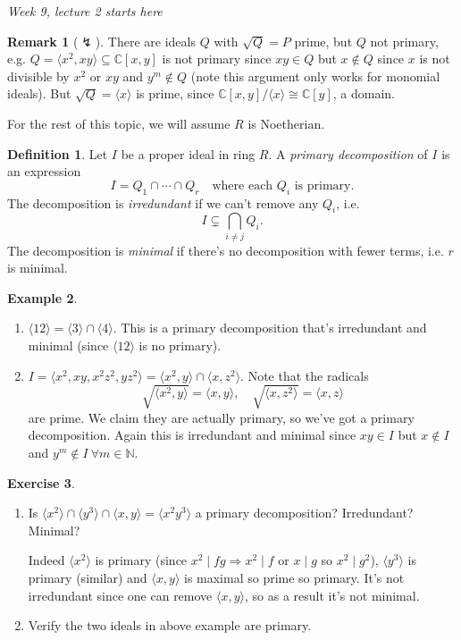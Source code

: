 \documentclass[a4paper]{article}
\newcommand{\la}{\langle}
\newcommand{\ra}{\rangle}
\newcommand{\C}{\mathbb C}
\theoremstyle{definition}
\newtheorem{defn}{Definition}[subsection]
\newtheorem{example}[defn]{Example}
\newtheorem{exe}[defn]{Exercise}
\newtheorem*{remark}{Remark}
\begin{document}
\begin{flushright}
\textit{Week 9, lecture 2 starts here}
\end{flushright}

\begin{remark}[$\lightning$]
There are ideals $Q$ with $\sqrt Q=P$ prime, but $Q$ not primary, e.g. $Q=\la x^2,xy\ra\subseteq\C[x,y]$ is not primary since $xy\in Q$ but $x\notin Q$ since $x$ is not divisible by $x^2$ or $xy$ and $y^m\notin Q$ (note this argument only works for monomial ideals). But $\sqrt Q=\la x\ra$ is prime, since $\C[x,y]/\la x\ra\cong\C[y]$, a domain.
\end{remark}

For the rest of this topic, we will assume $R$ is Noetherian.

\begin{defn}
Let $I$ be a proper ideal in ring $R$. A \textit{primary decomposition} of $I$ is an expression
\[
I=Q_1\cap \cdots \cap Q_r\quad\text{where each }Q_i\text{ is primary}.
\]
The decomposition is \textit{irredundant} if we can't remove any $Q_i$, i.e.
\[
I\subsetneq \bigcap_{i\neq j}Q_i .
\]
The decomposition is \textit{minimal} if there's no decomposition with fewer terms, i.e. $r$ is minimal.
\end{defn}

\begin{example}
\begin{enumerate}
\item $\la 12\ra=\la 3\ra\cap\la 4\ra$. This is a primary decomposition that's irredundant and minimal (since $\la 12\ra$ is no primary).
\item $I=\la x^2,xy,x^2 z^2,yz^2\ra=\la x^2,y\ra\cap\la x,z^2\ra$. Note that the radicals
\[
\sqrt{\la x^2,y\ra}=\la x,y\ra,\quad \sqrt{\la x,z^2\ra}=\la x,z\ra
\]
are prime. We claim they are actually primary, so we've got a primary decomposition. Again this is irredundant and minimal since $xy\in I$ but $x\notin I$ and $y^m\notin I \ \forall m\in\mathbb N$.
\end{enumerate}
\end{example}

\begin{exe}
\begin{enumerate}
\item Is $\la x^2\ra\cap\la y^3\ra\cap\la x,y\ra=\la x^2 y^3\ra$ a primary decomposition? Irredundant? Minimal?

Indeed $\la x^2\ra$ is primary (since $x^2\mid fg\Rightarrow x^2\mid f$ or $x\mid g$ so $x^2\mid g^2$), $\la y^3\ra$ is primary (similar) and $\la x,y\ra$ is maximal so prime so primary. It's not irredundant since one can remove $\la x,y\ra$, so as a result it's not minimal.
\item Verify the two ideals in above example are primary.
\end{enumerate}
\end{exe}
\end{document}
